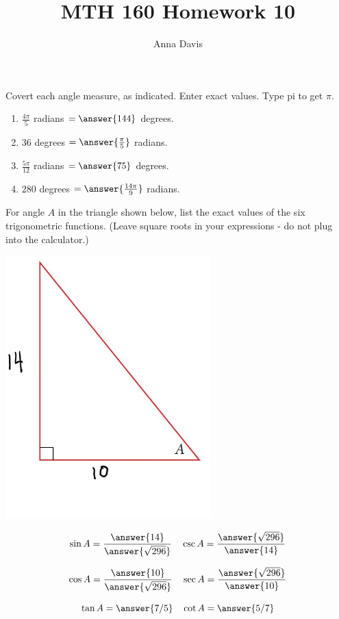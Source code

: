 \documentclass{ximera}
\author{Anna Davis} \title{MTH 160 Homework 10}
\begin{document}
\begin{abstract}

\end{abstract}
\maketitle

\begin{problem}\label{prob:160hom10prob1}
Covert each angle measure, as indicated.  Enter exact values.  Type pi to get $\pi$.
\begin{enumerate}
    \item $\frac{4\pi}{5}$ radians $=\answer{144}$ degrees.
    \item $36$ degrees $=\answer{\frac{\pi}{5}}$ radians.
    \item $\frac{5\pi}{12}$ radians $=\answer{75}$ degrees.
    \item $280$ degrees $=\answer{\frac{14\pi}{9}}$ radians.
\end{enumerate}
\end{problem}



\begin{problem}\label{prob:160hom10prob2}
For angle $A$ in the triangle shown below, list the exact values of the six trigonometric functions. (Leave square roots in your expressions - do not plug into the calculator.)
\begin{image}
   
\includegraphics[height=4in]{160H10pic5.jpg}~
 
\end{image}

$$\sin A=\frac{\answer{14}}{\answer{\sqrt{296}}}\quad \csc A=\frac{\answer{\sqrt{296}}}{\answer{14}}$$

$$\cos A=\frac{\answer{10}}{\answer{\sqrt{296}}}\quad \sec A=\frac{\answer{\sqrt{296}}}{\answer{10}}$$

$$\tan A=\answer{7/5}\quad \cot A=\answer{5/7}$$
\end{problem}
\end{document}
